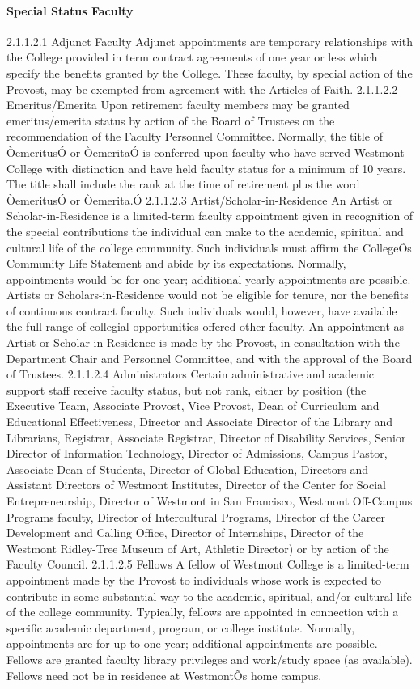 \documentclass[letterpaper, 11pt]{article}
\begin{document}
			\paragraph{Special Status Faculty}
				2.1.1.2.1 Adjunct Faculty
				Adjunct appointments are temporary relationships with the College provided in term contract agreements of one year or less which specify the benefits granted by the College. These faculty, by special action of the Provost, may be exempted from agreement with the Articles of Faith.
				2.1.1.2.2 Emeritus/Emerita
				Upon retirement faculty members may be granted emeritus/emerita status by action of the Board of Trustees on the recommendation of the Faculty Personnel Committee.  Normally, the title of ÒemeritusÓ or ÒemeritaÓ is conferred upon faculty who have served Westmont College with distinction and have held faculty status for a minimum of 10 years.  The title shall include the rank at the time of retirement plus the word ÒemeritusÓ or Òemerita.Ó
				2.1.1.2.3 Artist/Scholar-in-Residence
				An Artist or Scholar-in-Residence is a limited-term faculty appointment given in recognition of the special contributions the individual can make to the academic, spiritual and cultural life of the college community.  Such individuals must affirm the CollegeÕs Community Life Statement and abide by its expectations.  Normally, appointments would be for one year; additional yearly appointments are possible.  Artists or Scholars-in-Residence would not be eligible for tenure, nor the benefits of continuous contract faculty. Such individuals would, however, have available the full range of collegial opportunities offered other faculty.  An appointment as Artist or Scholar-in-Residence is made by the Provost, in consultation with the Department Chair and Personnel Committee, and with the approval of the Board of Trustees.
				2.1.1.2.4 Administrators
				Certain administrative and academic support staff receive faculty status, but not rank, either by position (the Executive Team, Associate Provost, Vice Provost, Dean of Curriculum and Educational Effectiveness, Director and Associate Director of the Library and Librarians, Registrar, Associate Registrar, Director of Disability Services, Senior Director of Information Technology, Director of Admissions, Campus Pastor, Associate Dean of Students, Director of Global Education, Directors and Assistant Directors of Westmont Institutes, Director of the Center for Social Entrepreneurship, Director of Westmont in San Francisco, Westmont Off-Campus Programs faculty, Director of Intercultural Programs, Director of the Career Development and Calling Office, Director of Internships, Director of the Westmont Ridley-Tree Museum of Art, Athletic Director) or by action of the Faculty Council.
				2.1.1.2.5 Fellows
				A fellow of Westmont College is a limited-term appointment made by the Provost to individuals whose work is expected to contribute in some substantial way to the academic, spiritual, and/or cultural life of the college community.  Typically, fellows are appointed in connection with a specific academic department, program, or college institute.  Normally, appointments are for up to one year; additional appointments are possible.  Fellows are granted faculty library privileges and work/study space (as available).  Fellows need not be in residence at WestmontÕs home campus.
\end{document}
